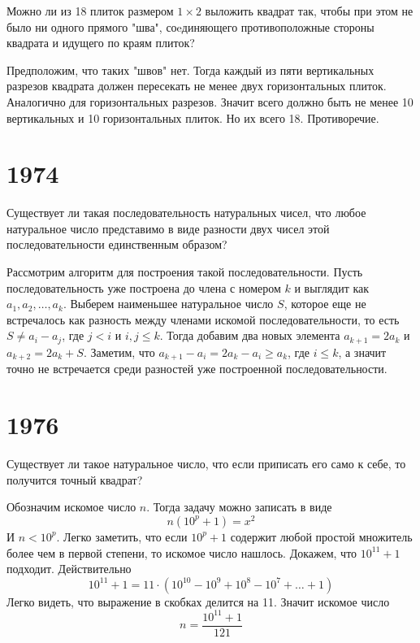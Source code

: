 \documentclass[11pt, a4paper]{problems_template}
\begin{document}
\begin{exercise}[63]
Можно ли из 18 плиток размером $1 \times 2$ выложить квадрат так, чтобы при этом не было ни одного прямого "шва", соeдиняющего противоположные стороны квадрата и идущего по краям плиток?
\end{exercise}

\begin{Solution}
Предположим, что таких "швов" нет. Тогда каждый из пяти вертикальных разрезов квадрата должен пересекать не менее двух горизонтальных плиток. Аналогично для горизонтальных разрезов. Значит всего должно быть не менее 10 вертикальных и 10 горизонтальных плиток. Но их всего 18. Противоречие. 
\end{Solution}

\chapter{1974}

\begin{exercise}[287]
Существует ли такая последовательность натуральных чисел, что любое натуральное число представимо в виде разности двух чисел этой последовательности единственным образом?
\end{exercise}

\begin{Solution}
Рассмотрим алгоритм для построения такой последовательности. Пусть последовательность уже построена до члена с номером $k$ и выглядит как $a_{1}, a_{2}, \dots, a_{k}$. Выберем наименьшее натуральное число $S$, которое еще не встречалось как разность между членами искомой последовательности, то есть $S \neq a_{i} - a_{j}$, где $j < i$ и $i, j \leqslant k$. Тогда добавим два новых элемента $a_{k+1} = 2a_{k}$ и $a_{k+2} = 2a_{k} + S$. Заметим, что $a_{k+1} - a_{i} = 2a_{k} - a_{i} \geqslant a_{k}$, где $i \leqslant k$, а значит точно не встречается среди разностей уже построенной последовательности. 
\end{Solution}

\chapter{1976}

\begin{exercise}[387]
Существует ли такое натуральное число, что если приписать его само к себе, то получится точный квадрат? 
\end{exercise}

\begin{Solution}
Обозначим искомое число $n$. Тогда задачу можно записать в виде
$$
n(10^{p}+1) = x^{2}
$$
И $n < 10^{p}$. Легко заметить, что если $10^{p} + 1$ содержит любой простой множитель более чем в первой степени, то искомое число нашлось. Докажем, что $10^{11}+1$ подходит. Действительно
$$
10^{11}+1 = 11 \cdot (10^{10} - 10^{9} + 10^{8} - 10^{7} + \dots + 1)
$$
Легко видеть, что выражение в скобках делится на 11. Значит искомое число
$$
n = \frac{10^{11} + 1}{121}
$$ 
\end{Solution}
\end{document}

